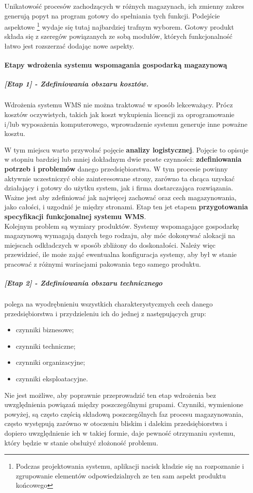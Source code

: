 	Unikatowość procesów zachodzących w różnych magazynach, ich zmienny zakres generują popyt
	na program gotowy do spełniania tych funkcji. Podejście aspektowe \footnote{
		Podczas projektowania systemu, aplikacji nacisk kładzie się na rozpoznanie i
		zgrupowanie elementów odpowiedzialnych ze ten sam aspekt produktu końcowego	
	} wydaje się tutaj najbardziej trafnym wyborem. Gotowy produkt składa się z szeregów
	powiązanych ze sobą modułów, których funkcjonalność łatwo jest rozszerzać dodając nowe
	aspekty.
	
	\paragraph{Etapy wdrożenia systemu wspomagania gospodarką magazynową}
		\subparagraph{[Etap 1] - \textbf{Zdefiniowania obszaru kosztów.}} 			
		\label{c5:introducing_wms_stage_1}
			Wdrożenia systemu WMS nie można traktować w sposób lekceważący. Prócz kosztów oczywistych,
			takich jak koszt wykupienia licencji za oprogramowanie i/lub wyposażenia komputerowego,
			wprowadzenie systemu generuje inne poważne kosztu. 
			
			W tym miejscu warto przywołać pojęcie \textbf{analizy logistycznej}. Pojęcie to opisuje w stopniu
			bardziej lub mniej dokładnym dwie proste czynności: \textbf{zdefiniowania potrzeb i problemów} 
			danego przedsiębiorstwa. W tym procesie powinny aktywnie uczestniczyć obie zainteresowane strony, 
			zarówno ta chcąca uzyskać działający i gotowy do użytku system, jak i firma dostarczająca
			rozwiązania. Ważne jest aby zdefiniować jak najwięcej zachować oraz cech magazynowania, jako całości,
			i uzgodnić je między stronami. Etap ten jet etapem \textbf{przygotowania specyfikacji 
			funkcjonalnej systemu WMS}. \\
			
			Kolejnym problem są wymiary produktów. Systemy wspomagające gospodarkę magazynową wymagają danych
			tego rodzaju, aby móc dokonywać alokacji na miejscach odkładczych w sposób zbliżony do doskonałości.
			Należy więc przewidzieć, ile może zająć ewentualna konfiguracja systemy, aby był w stanie pracować
			z różnymi wariacjami pakowania tego samego produktu.
		\subparagraph{[Etap 2] - \textbf{Zdefiniowania obszaru technicznego}} 	
		\label{c5:introducing_wms_stage_2}
			polega na wyodrębnieniu
			wszystkich charakterystycznych cech danego przedsiębiorstwa i
			przydzieleniu ich do jednej z następujących grup:
			\begin{itemize}
				\item czynniki biznesowe;
				\item czynniki techniczne;
				\item czynniki organizacyjne;
				\item czynniki eksploatacyjne.
			\end{itemize}
			Nie jest możliwe, aby poprawnie przeprowadzić ten etap wdrożenia bez uwzględnienia
			powiązań między poszczególnymi grupami. Czynniki, wymienione powyżej, są często
			częścią składową poszczególnych faz procesu magazynowania, często występują zarówno
			w otoczeniu bliskim i dalekim przedsiębiorstwa i dopiero uwzględnienie ich w takiej
			formie, daje pewność otrzymaniu systemu, który będzie w stanie obsłużyć 
			złożoność problemu.

